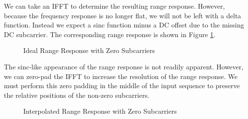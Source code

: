 \documentclass[conference]{IEEEtran}
\begin{document}
		We can take an IFFT to determine the resulting range response. However, because the frequency response is no longer flat, we will not be left with a delta function. Instead we expect a sinc function minus a DC offset due to the missing DC subcarrier. The corresponding range response is shown in Figure \ref{fig::ofdm_radar_range_resp_no_window}.
		
		\begin{figure}[H]
			\centering
    			\caption{Ideal Range Response with Zero Subcarriers}
    			\label{fig::ofdm_radar_range_resp_no_window}
  	  	\end{figure}
		
		The sinc-like appearance of the range response is not readily apparent. However, we can zero-pad the IFFT to increase the resolution of the range response. We must perform this zero padding in the middle of the input sequence to preserve the relative positions of the non-zero subcarriers.
		
		\begin{figure}[H]
			\centering
    			\caption{Interpolated Range Response with Zero Subcarriers}
    			\label{fig::ofdm_radar_range_resp_no_window_zpad}
  	  	\end{figure}
  	  	
\end{document}
